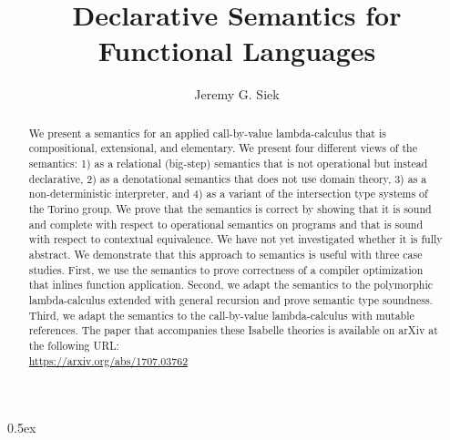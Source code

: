 \documentclass[10pt,a4paper]{article}
\begin{document}
\title{Declarative Semantics for Functional Languages}
\author{Jeremy G. Siek}
\maketitle

\begin{abstract}
We present a semantics for an applied call-by-value
lambda-calculus that is compositional, extensional, and
elementary. We present four different views of the semantics: 1)
as a relational (big-step) semantics that is not operational but
instead declarative, 2) as a denotational semantics that does not
use domain theory, 3) as a non-deterministic interpreter, and 4)
as a variant of the intersection type systems of the Torino
group.  We prove that the semantics is correct by showing that it
is sound and complete with respect to operational semantics on
programs and that is sound with respect to contextual
equivalence. We have not yet investigated whether it is fully
abstract. We demonstrate that this approach to semantics is
useful with three case studies. First, we use the semantics to
prove correctness of a compiler optimization that inlines
function application. Second, we adapt the semantics to the
polymorphic lambda-calculus extended with general recursion and
prove semantic type soundness.  Third, we adapt the semantics to
the call-by-value lambda-calculus with mutable references.
The paper that accompanies these Isabelle theories is available
on arXiv at the following URL: \\
\url{https://arxiv.org/abs/1707.03762}
\end{abstract}

\tableofcontents

\parindent 0pt\parskip 0.5ex

\pagebreak



%
%
\end{document}
